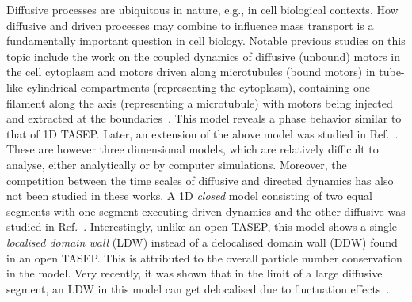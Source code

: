 \documentclass[aps,pre,twocolumn,superscriptaddress,amsmath,amssymb,longbibliography,floatfix,nofootinbib]{revtex4}
\begin{document}
Diffusive processes are ubiquitous in nature, e.g., in cell biological contexts. How diffusive and driven processes may combine to influence mass transport is a fundamentally important question in cell biology. Notable previous studies on this topic include the work on the coupled dynamics of diffusive (unbound) motors
in the cell cytoplasm and motors driven along microtubules (bound motors) in tube-like cylindrical compartments (representing the
cytoplasm), containing one filament along the axis (representing a microtubule)
with motors being injected and extracted at the boundaries~\cite{lipowsky}.
This model
reveals a phase behavior similar to that of 1D TASEP. Later, an extension of the above
model was studied in Ref.~\cite{santen1}. These are however
three dimensional models, which are relatively difficult to analyse, either
analytically or by computer simulations. Moreover, the competition between the time scales of
diffusive and directed dynamics has also not been studied in these works. A 1D {\em closed} model consisting of two equal segments with one segment executing driven dynamics and the other diffusive was studied in Ref.~\cite{hinsch}. Interestingly, unlike an open TASEP, this model shows a single {\em localised domain wall} (LDW) instead of a delocalised domain wall (DDW) found in an open TASEP. This is attributed to the overall particle number conservation in the model. Very recently, it was shown that in the limit of a large diffusive segment, an LDW in this model can get delocalised due to fluctuation effects~\cite{parna}.
\end{document}
